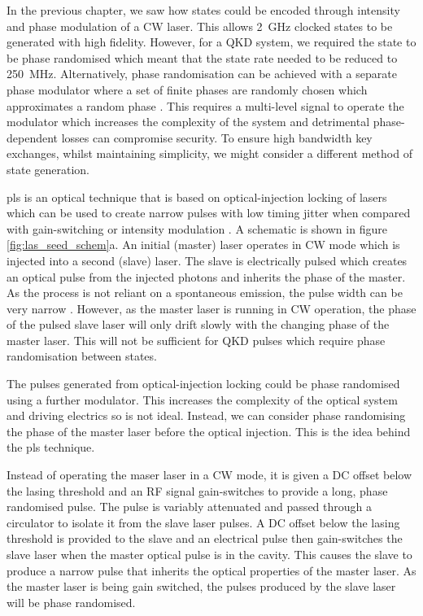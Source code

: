 In the previous chapter, we saw how states could be encoded through intensity and phase modulation of a \ac{CW} laser. This allows \SI{2}{GHz} clocked states to be generated with high fidelity. However, for a \ac{QKD} system, we required the state to be phase randomised which meant that the state rate needed to be reduced to \SI{250}{MHz}. Alternatively, phase randomisation can be achieved with a separate phase modulator where a set of finite phases are randomly chosen which approximates a random phase \cite{Sibson2017InP}. This requires a multi-level signal to operate the modulator which increases the complexity of the system and detrimental phase-dependent losses can compromise security. To ensure high bandwidth key exchanges, whilst maintaining simplicity, we might consider a different method of state generation.

\Ac{pls} is an optical technique that is based on optical-injection locking of lasers which can be used to create narrow pulses with low timing jitter when compared with gain-switching or intensity modulation \cite{Seo1996, Gunning1996}. A schematic is shown in figure \ref{fig:las_seed_schem}a. An initial (master) laser operates in \ac{CW} mode which is injected into a second (slave) laser. The slave is electrically pulsed which creates an optical pulse from the injected photons and inherits the phase of the master. As the process is not reliant on a spontaneous emission, the pulse width can be very narrow \cite{Comandar2016PLS}. However, as the master laser is running in \ac{CW} operation, the phase of the pulsed slave laser will only drift slowly with the changing phase of the master laser. This will not be sufficient for \ac{QKD} pulses which require phase randomisation between states. 


The pulses generated from optical-injection locking could be phase randomised using a further modulator. This increases the complexity of the optical system and driving electrics so is not ideal. Instead, we can consider phase randomising the phase of the master laser before the optical injection. This is the idea behind the \ac{pls} technique.

Instead of operating the maser laser in a \ac{CW} mode, it is given a DC offset below the lasing threshold and an RF signal gain-switches to provide a long, phase randomised pulse. The pulse is variably attenuated and passed through a circulator to isolate it from the slave laser pulses. A DC offset below the lasing threshold is provided to the slave and an electrical pulse then gain-switches the slave laser when the master optical pulse is in the cavity. This causes the slave to produce a narrow pulse that inherits the optical properties of the master laser. As the master laser is being gain switched, the pulses produced by the slave laser will be phase randomised.

